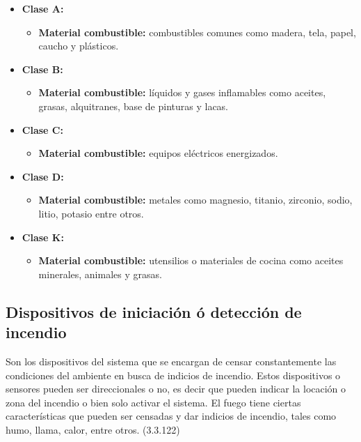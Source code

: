 \begin{itemize}
	
	\item \textbf{Clase A:} 
	
\begin{itemize}
	\item \textbf{Material combustible:} combustibles comunes como madera, tela, papel, caucho y plásticos.
\end{itemize}
	
	
	\item \textbf{Clase B:} 

\begin{itemize}
	\item \textbf{Material combustible:} líquidos y gases inflamables como aceites, grasas,
	alquitranes, base de pinturas y lacas.
\end{itemize}	


	\item \textbf{Clase C:} 

\begin{itemize}
	\item \textbf{Material combustible:} equipos eléctricos energizados.
\end{itemize}



	\item \textbf{Clase D:} 

\begin{itemize}
	\item \textbf{Material combustible:} metales como magnesio, titanio, zirconio, sodio, litio, potasio entre otros.
\end{itemize}

	\item \textbf{Clase K:} 

\begin{itemize}
	\item \textbf{Material combustible:} utensilios o materiales de cocina como aceites minerales, animales y grasas.
\end{itemize}

	
	
\end{itemize}


\subsection{Dispositivos de iniciación ó detección de incendio}


Son los dispositivos del sistema que se encargan de censar constantemente las condiciones del ambiente en busca de indicios de incendio. Estos dispositivos o sensores pueden ser direccionales o no, es decir que pueden indicar la locación o zona del incendio o bien solo activar el sistema. El fuego tiene ciertas características que pueden ser censadas y dar indicios de incendio, tales como humo, llama, calor, entre otros. (3.3.122) \cite{NFPA72} 

